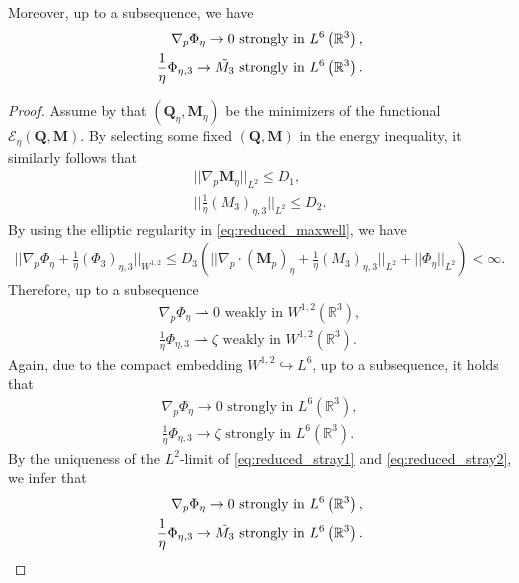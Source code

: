 \documentclass{article}
\def\Qvec{\mathbf{Q}}
\def \Mvec{\mathbf{M}}
\begin{document}
\noindent Moreover, up to a subsequence, we have
\begin{eqnarray}
\nabla_p\Phi_{\eta}\rightarrow 0 \mbox{ strongly in } L^6\left(\mathbb R^3\right),\\
\frac{1}{\eta}\Phi_{\eta,3}\rightarrow \Tilde{M_3} \mbox{ strongly in } L^6\left(\mathbb R^3\right).  
\end{eqnarray}
\begin{proof}
Assume by  that $\left(\Qvec_{\eta}, \Mvec_{\eta}\right)$ be the minimizers of the functional $\mathcal{E}_{\eta}\left(\Qvec, \Mvec\right)$. By selecting some fixed $\left(\Qvec, \Mvec\right)$ in the energy inequality, it similarly follows that 
\begin{eqnarray}
||\nabla_p\Mvec_{\eta}||_{L^2}\le D_1,\label{eq:prop1}\\
\bigg|\bigg|\frac{1}{\eta}\left(M_{3}\right)_{\eta, 3}\bigg|\bigg|_{L^2}\le D_2.
\end{eqnarray}
By using the elliptic regularity in \eqref{eq:reduced_maxwell}, we have
\begin{eqnarray}
\bigg|\bigg|\nabla_p\Phi_{\eta}+\frac{1}{\eta}\left(\Phi_{3}\right)_{\eta, 3}\bigg|\bigg|_{W^{1,2}}\le D_3\left(\bigg|\bigg|\nabla_p\cdot\left(\Mvec_p\right)_{\eta}+\frac{1}{\eta}\left(M_3\right)_{\eta,3}\bigg|\bigg|_{L^2}+\big|\big|\Phi_{\eta}\big|\big|_{L^2} \right)<\infty.\label{eq:improved_con3}
\end{eqnarray}
Therefore, up to a subsequence
\begin{eqnarray}
\nabla_p\Phi_{\eta}\rightharpoonup 0 \mbox{ weakly in } W^{1,2}\left(\mathbb R^3\right),\\
\frac{1}{\eta}\Phi_{\eta,3}\rightharpoonup \zeta \mbox{ weakly in } W^{1,2}\left(\mathbb R^3\right).
\end{eqnarray}
Again, due to the compact embedding  $W^{1,2}\hookrightarrow L^6$, up to a subsequence, it holds that
\begin{eqnarray}
\nabla_p\Phi_{\eta}\rightarrow 0 \mbox{ strongly in } L^6\left(\mathbb R^3\right),\\
\frac{1}{\eta}\Phi_{\eta,3}\rightarrow \zeta \mbox{ strongly in } L^6\left(\mathbb R^3\right).   
\end{eqnarray}
By the uniqueness of the $L^2$-limit of \eqref{eq:reduced_stray1} and \eqref{eq:reduced_stray2}, we infer that
\begin{eqnarray}
\nabla_p\Phi_{\eta}\rightarrow 0 \mbox{ strongly in } L^6\left(\mathbb R^3\right),\\
\frac{1}{\eta}\Phi_{\eta,3}\rightarrow \Tilde{M_3} \mbox{ strongly in } L^6\left(\mathbb R^3\right).       
\end{eqnarray}
\end{proof}
\end{document}
